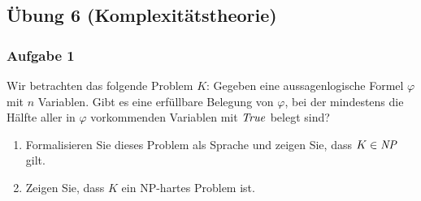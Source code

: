 \newpage
\subsection*{Übung 6 (Komplexitätstheorie)}
\subsubsection*{Aufgabe 1}
    Wir betrachten das folgende Problem $K$: Gegeben eine aussagenlogische Formel $\varphi$ mit $n$ Variablen. Gibt es eine erfüllbare Belegung von $\varphi$, bei der mindestens die Hälfte aller in $\varphi$ vorkommenden Variablen mit $\mathit{True}$ belegt sind?
    \begin{enumerate}
        \item Formalisieren Sie dieses Problem als Sprache und zeigen Sie, dass $K \in \mathit{NP}$ gilt.
        \item Zeigen Sie, dass $K$ ein NP-hartes Problem ist.
    \end{enumerate}

